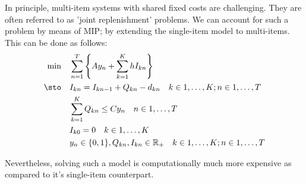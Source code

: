 \begin{solution}
In principle, multi-item systems with shared fixed costs are challenging. They are often referred to as 'joint replenishment' problems. We can account for such a problem by means of MIP; by extending the single-item model to multi-items. This can be done as follows:
\begin{align*}
\min\quad 
	& \sum_{n=1}^T \left\{A y_n + \sum_{k=1}^K h I_{kn}\right\} \\
\sto\quad
	& I_{kn} = I_{kn-1} + Q_{kn} - d_{kn} \quad k\in 1,\ldots,K; n\in 1,\ldots,T \\
	& \sum_{k=1}^K Q_{kn} \leq C y_n \quad n\in 1,\ldots,T \\
	& I_{k0} = 0 \quad k\in 1,\ldots,K \\
	& y_n \in \{0,1\}, Q_{kn}, I_{kn} \in \mathbb{R}_+ \quad k\in 1,\ldots,K; n\in 1,\ldots,T
\end{align*}

Nevertheless, solving such a model is computationally much more expensive as compared to it's single-item counterpart.

 
\end{solution}

